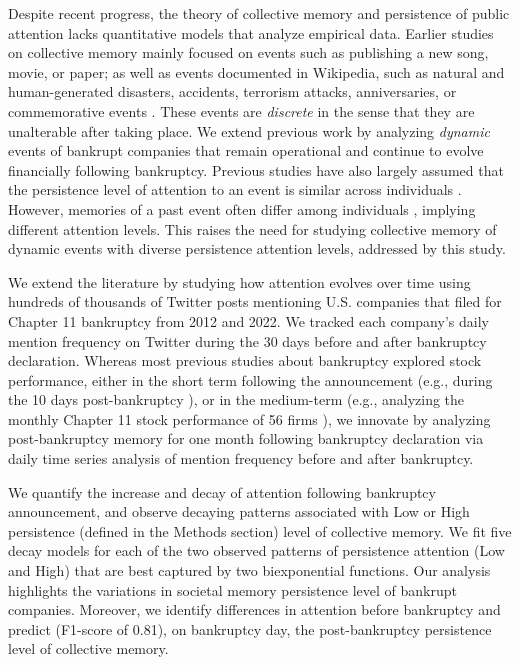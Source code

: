 \documentclass[9pt,twocolumn,twoside,lineno]{pnas-new}
\begin{document}
Despite recent progress, the theory of collective memory and persistence of public attention lacks quantitative models that analyze empirical data.
Earlier studies on collective memory mainly focused on events such as publishing a new song, movie, or paper; as well as events documented in Wikipedia, such as natural and human-generated disasters, accidents, terrorism attacks, anniversaries, or commemorative events \cite{yu2016pantheon, candia2019universal, west2021postmortem, jara2019medium, higham2017fame,garcia2017memory}.
These events are \textit{discrete} in the sense that they are unalterable after taking place.
We extend previous work by analyzing \textit{dynamic} events of bankrupt companies that remain operational and continue to evolve financially following bankruptcy.
Previous studies have also largely assumed that the persistence level of attention to an event is similar across individuals \cite{candia2019universal, igarashi2022two, west2021postmortem}.
However, memories of a past event often differ among individuals \cite{mena2016forgetting}, implying different attention levels.
This raises the need for studying collective memory of dynamic events with diverse persistence attention levels, addressed by this study.

We extend the literature by studying how attention evolves over time using hundreds of thousands of Twitter posts mentioning U.S. companies that filed for Chapter 11 bankruptcy from 2012 and 2022. 
We tracked each company's daily mention frequency on Twitter during the 30 days before and after bankruptcy declaration.
Whereas most previous studies about bankruptcy explored stock performance, either in the short term following the announcement (e.g., during the 10 days post-bankruptcy \cite{dawkins2007systematic}), or in the medium-term (e.g., analyzing the monthly Chapter 11 stock performance of 56 firms \cite{morse1988investing}), we innovate by analyzing post-bankruptcy memory for one month following bankruptcy declaration via daily time series analysis of mention frequency before and after bankruptcy.

We quantify the increase and decay of attention following bankruptcy announcement, and observe decaying patterns associated with Low or High persistence (defined in the Methods section) level of collective memory.
We fit five decay models for each of the two observed patterns of persistence attention (Low and High) that are best captured by two biexponential functions.
Our analysis highlights the variations in societal memory persistence level of bankrupt companies.
Moreover, we identify differences in attention before bankruptcy and predict (F1-score of 0.81), on bankruptcy day, the post-bankruptcy persistence level of collective memory.
\end{document}
